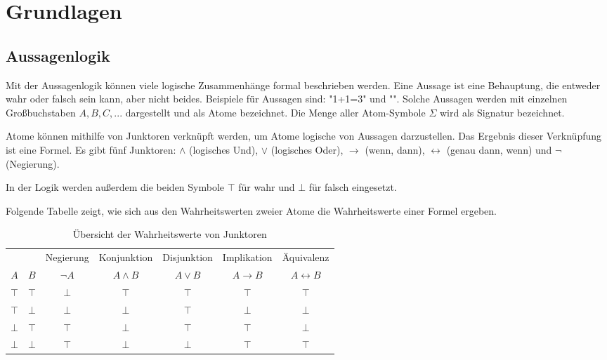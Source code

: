 
\chapter{Grundlagen}
	\section{Aussagenlogik}

Mit der Aussagenlogik können viele logische Zusammenhänge formal beschrieben werden. Eine Aussage ist eine Behauptung, die entweder wahr oder falsch sein kann, aber nicht beides. Beispiele für Aussagen sind: "1+1=3" und "". Solche Aussagen werden mit einzelnen Großbuchstaben $A, B, C, ...$ dargestellt und als Atome bezeichnet. Die Menge aller Atom-Symbole $\Sigma$ wird als Signatur bezeichnet. 

Atome können mithilfe von Junktoren verknüpft werden, um Atome logische von Aussagen darzustellen. Das Ergebnis dieser Verknüpfung ist eine Formel. 
Es gibt fünf Junktoren: $\wedge$ (logisches Und), $\vee$ (logisches Oder), $\to$ (wenn, dann), $\leftrightarrow$ (genau dann, wenn) und $\neg$ (Negierung).

In der Logik werden außerdem die beiden Symbole $\top$ für wahr und $\bot$ für falsch eingesetzt. 

Folgende Tabelle zeigt, wie sich aus den Wahrheitswerten zweier Atome die Wahrheitswerte einer Formel ergeben.

\begin{table}[h]
	\centering
	\begin{tabular}{| c | c || c | c | c | c | c |}
		\hline
		&& Negierung & Konjunktion & Disjunktion & Implikation & Äquivalenz \\
		$A$ & $B$ & $\neg A$ & $A \wedge B$ & $A \vee B$ & $A \to B$ & $A \leftrightarrow B$ \\
		\hline
		$\top$ & $\top$ & $\bot$ & $\top$ & $\top$ & $\top$ & $\top$ \\
		$\top$ & $\bot$ & $\bot$ & $\bot$ & $\top$ & $\bot$ & $\bot$ \\
		$\bot$ & $\top$ & $\top$ & $\bot$ & $\top$ & $\top$ & $\bot$ \\
		$\bot$ & $\bot$ & $\top$ & $\bot$ & $\bot$ & $\top$ & $\top$ \\
		\hline
	\end{tabular}
	\caption{Übersicht der Wahrheitswerte von Junktoren}
	\label{table:Junktoren}
\end{table}


